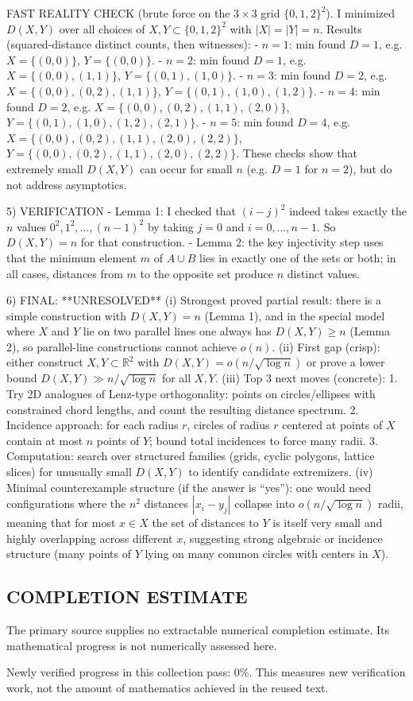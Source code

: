 FAST REALITY CHECK (brute force on the $3\times 3$ grid $\{0,1,2\}^2$).
I minimized $D(X,Y)$ over all choices of $X,Y\subset\{0,1,2\}^2$ with $|X|=|Y|=n$. Results (squared-distance distinct counts, then witnesses):
- $n=1$: min found $D=1$, e.g. $X=\{(0,0)\}$, $Y=\{(0,0)\}$.
- $n=2$: min found $D=1$, e.g. $X=\{(0,0), (1,1)\}$, $Y=\{(0,1), (1,0)\}$.
- $n=3$: min found $D=2$, e.g. $X=\{(0,0), (0,2), (1,1)\}$, $Y=\{(0,1), (1,0), (1,2)\}$.
- $n=4$: min found $D=2$, e.g. $X=\{(0,0), (0,2), (1,1), (2,0)\}$, $Y=\{(0,1), (1,0), (1,2), (2,1)\}$.
- $n=5$: min found $D=4$, e.g. $X=\{(0,0), (0,2), (1,1), (2,0), (2,2)\}$, $Y=\{(0,0), (0,2), (1,1), (2,0), (2,2)\}$.
These checks show that extremely small $D(X,Y)$ can occur for small $n$ (e.g. $D=1$ for $n=2$), but do not address asymptotics.

5) VERIFICATION
- Lemma 1: I checked that $(i-j)^2$ indeed takes exactly the $n$ values $0^2,1^2,\ldots,(n-1)^2$ by taking $j=0$ and $i=0,\ldots,n-1$. So $D(X,Y)=n$ for that construction.
- Lemma 2: the key injectivity step uses that the minimum element $m$ of $A\cup B$ lies in exactly one of the sets or both; in all cases, distances from $m$ to the opposite set produce $n$ distinct values.

6) FINAL: **UNRESOLVED**
(i) Strongest proved partial result: there is a simple construction with $D(X,Y)=n$ (Lemma 1), and in the special model where $X$ and $Y$ lie on two parallel lines one always has $D(X,Y)\ge n$ (Lemma 2), so parallel-line constructions cannot achieve $o(n)$.
(ii) First gap (crisp): either construct $X,Y\subset\mathbb{R}^2$ with $D(X,Y)=o(n/\sqrt{\log n})$ or prove a lower bound $D(X,Y)\gg n/\sqrt{\log n}$ for all $X,Y$.
(iii) Top 3 next moves (concrete):
  1. Try 2D analogues of Lenz-type orthogonality: points on circles/ellipses with constrained chord lengths, and count the resulting distance spectrum.
  2. Incidence approach: for each radius $r$, circles of radius $r$ centered at points of $X$ contain at most $n$ points of $Y$; bound total incidences to force many radii.
  3. Computation: search over structured families (grids, cyclic polygons, lattice slices) for unusually small $D(X,Y)$ to identify candidate extremizers.
(iv) Minimal counterexample structure (if the answer is ``yes''): one would need configurations where the $n^2$ distances $|x_i-y_j|$ collapse into $o(n/\sqrt{\log n})$ radii, meaning that for most $x\in X$ the set of distances to $Y$ is itself very small and highly overlapping across different $x$, suggesting strong algebraic or incidence structure (many points of $Y$ lying on many common circles with centers in $X$).



\subsection*{COMPLETION ESTIMATE}
The primary source supplies no extractable numerical completion estimate. Its mathematical progress is not numerically assessed here.

Newly verified progress in this collection pass: $0\%$. This measures new verification work, not the amount of mathematics achieved in the reused text.

